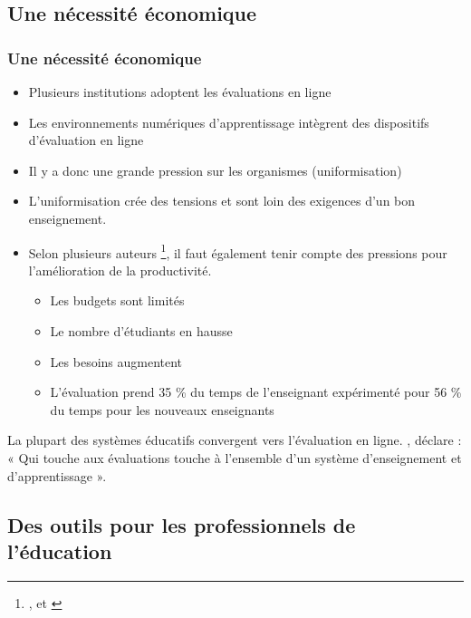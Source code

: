 \documentclass[aspectratio=169]{beamer}
\begin{document}
		\subsection{Une nécessité économique \citep{Dubreucq2011}} 
			\begin{frame}[allowframebreaks]
			 	\frametitle{Une nécessité économique \citep{Dubreucq2011}}
				\begin {itemize}
					\item Plusieurs institutions adoptent les évaluations en ligne
					\item Les environnements numériques d'apprentissage intègrent des dispositifs d'évaluation en ligne
					\item Il y a donc une grande pression sur les organismes (uniformisation)
					\item L'uniformisation crée des tensions et sont loin des exigences d'un bon enseignement.
					\framebreak
					\item Selon plusieurs auteurs \footnote{\citet{audet2011a}, \citet{dirks1998a} et \citet{becta2006a}}, il faut également tenir compte des pressions pour l'amélioration de la productivité. 
						\begin {itemize}
							\item Les budgets sont limités
							\item Le nombre d'étudiants en hausse
							\item Les besoins augmentent
							\item L'évaluation prend 35 \% du temps de l'enseignant expérimenté pour 56 \% du temps pour les nouveaux enseignants
						\end{itemize}		
				\end{itemize}
				\framebreak
				La plupart des systèmes éducatifs convergent vers l'évaluation en ligne.
				\citet{Dubreucq2011}, déclare : « Qui touche aux évaluations touche à l'ensemble d'un système d'enseignement et d'apprentissage ».
			\end{frame}
			
		\subsection{Des outils pour les professionnels de l'éducation\citep{Dubreucq2011}} 
			\begin{frame}
			\end{frame}
			
\end{document}
